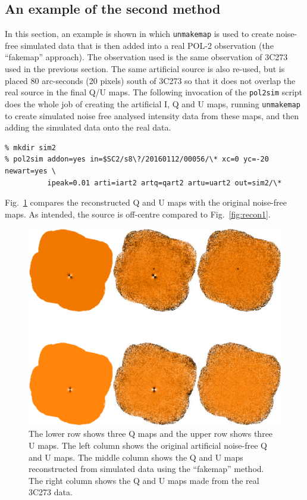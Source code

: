 \documentclass[twoside,11pt]{starlink}
\begin{document}
\subsection{An example of the second method}
\label{sec:fakemap}
In this section, an example is shown in which \texttt{unmakemap} is used
to create noise-free simulated data that is then added into a real POL-2
observation (the ``fakemap'' approach). The observation used is the same
observation of 3C273 used in the previous section. The same artificial
source is also re-used, but is placed 80 arc-seconds (20 pixels) south of
3C273 so that it does not overlap the real source in the final Q/U maps.
The following invocation of the \texttt{pol2sim} script does the whole
job of creating the artificial I, Q and U maps, running
\texttt{unmakemap} to create simulated noise free analysed intensity data
from these maps, and then adding the simulated data onto the real data.

\begin{verbatim}
% mkdir sim2
% pol2sim addon=yes in=$SC2/s8\?/20160112/00056/\* xc=0 yc=-20 newart=yes \
          ipeak=0.01 arti=iart2 artq=qart2 artu=uart2 out=sim2/\*
\end{verbatim}

Fig.~\ref{fig:recon1b} compares the reconstructed Q and U maps with the
original noise-free maps. As intended, the source is off-centre compared
to Fig.~\ref{fig:recon1}.

\begin{figure}
\includegraphics[width=\columnwidth]{recon1b}
\caption{The lower row shows three Q maps and the upper row shows three U
maps. The left column shows the original artificial noise-free Q and U
maps. The middle column shows the Q and U maps reconstructed from
simulated data using the ``fakemap'' method. The right column shows the
Q and U maps made from the real 3C273 data.}
\label{fig:recon1b}
\end{figure}
\end{document}
